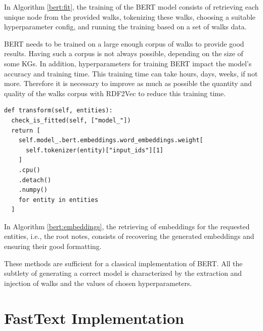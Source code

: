 In Algorithm \ref{bert:fit}, the training of the BERT model consists of
retrieving each unique node from the provided walks, tokenizing these walks,
choosing a suitable hyperparameter config, and running the training based on a
set of walks data.

BERT needs to be trained on a large enough corpus of walks to provide good
results. Having such a corpus is not always possible, depending on the size of
some KGs. In addition, hyperparameters for training BERT impact the model's
accuracy and training time. This training time can take hours, days, weeks, if
not more. Therefore it is necessary to improve as much as possible the quantity
and quality of the walks corpus with RDF2Vec to reduce this training time.

\begin{lstlisting}[caption=Getting the Entities' Embeddings with BERT.,label=bert:embeddings]
def transform(self, entities):
  check_is_fitted(self, ["model_"])
  return [
    self.model_.bert.embeddings.word_embeddings.weight[
      self.tokenizer(entity)["input_ids"][1]
    ]
    .cpu()
    .detach()
    .numpy()
    for entity in entities
  ]
\end{lstlisting}

In Algorithm \ref{bert:embeddings}, the retrieving of embeddings for the
requested entities, i.e., the root notes, consists of recovering the generated
embeddings and ensuring their good formatting.

These methods are sufficient for a classical implementation of BERT. All the
subtlety of generating a correct model is characterized by the extraction and
injection of walks and the values of chosen hyperparameters.

\section{FastText Implementation}
\label{sec:fasttext:implementation}


